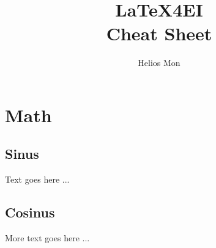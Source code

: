 \documentclass[german]{latex4ei/latex4ei_sheet}
\title{LaTeX4EI \\ Cheat Sheet}
\author{Helios Mon}                    %
\begin{document}
\maketitle   %


\section{Math}


\begin{sectionbox}
    \subsection{Sinus}

    Text goes here ...


\end{sectionbox}


\begin{sectionbox}
    \subsection{Cosinus}

    More text goes here ...

\end{sectionbox}

\end{document}
